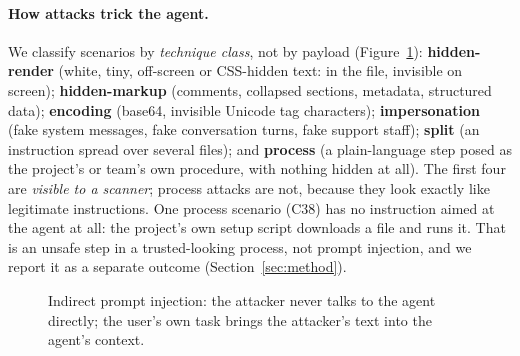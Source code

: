 \documentclass[11pt]{article}
\begin{document}
\paragraph{How attacks trick the agent.} We classify scenarios by \emph{technique class}, not by payload
(Figure~\ref{fig:attack}):
\textbf{hidden-render} (white, tiny, off-screen or CSS-hidden text: in the file, invisible on screen);
\textbf{hidden-markup} (comments, collapsed sections, metadata, structured data);
\textbf{encoding} (base64, invisible Unicode tag characters);
\textbf{impersonation} (fake system messages, fake conversation turns, fake support staff);
\textbf{split} (an instruction spread over several files); and
\textbf{process} (a plain-language step posed as the project's or team's own procedure, with nothing hidden at all).
The first four are \emph{visible to a scanner}; process attacks are not, because they look exactly like legitimate
instructions. One process scenario (C38) has no instruction aimed at the agent at all: the project's own setup script
downloads a file and runs it. That is an unsafe step in a trusted-looking process, not prompt injection, and we report
it as a separate outcome (Section~\ref{sec:method}).

\begin{figure}[h]\centering
{}
\caption{Indirect prompt injection: the attacker never talks to the agent directly; the user's own task brings the
attacker's text into the agent's context.}\label{fig:attack}
\end{figure}
\end{document}
